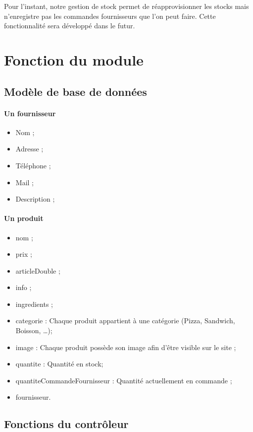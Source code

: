\documentclass[twoside,UTF8]{EPURapport}
\begin{document}
Pour l'instant, notre gestion de stock permet de réapprovisionner les stocks mais n'enregistre pas les commandes fournisseurs que l'on peut faire. Cette fonctionnalité sera développé dans le futur.

\section{Fonction du module}
    \subsection{Modèle de base de données}
\paragraph{Un fournisseur}
\begin{itemize}
    \item Nom ;
    \item Adresse ;
    \item Téléphone ;
    \item Mail ;
    \item Description ;
\end{itemize}

\paragraph{Un produit}
\begin{itemize}
        \item nom ;
        \item prix ;
        \item articleDouble ;
        \item info ;
        \item ingredients ;
        \item categorie : Chaque produit appartient à une catégorie (Pizza, Sandwich, Boisson, \ldots);
        \item image : Chaque produit possède son image afin d'être visible sur le site ;
        \item quantite : Quantité en stock;
        \item quantiteCommandeFournisseur : Quantité actuellement en commande ;
        \item fournisseur.
\end{itemize}

    \subsection{Fonctions du contrôleur}
\end{document}
